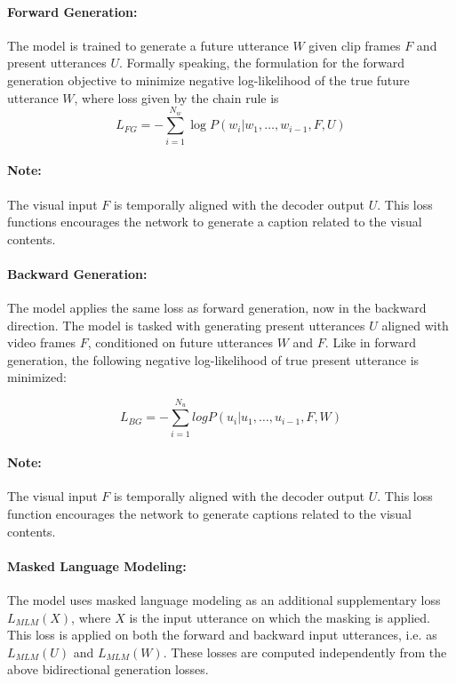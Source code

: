 \documentclass{article}
\begin{document}
\paragraph{Forward Generation:} The model is trained to generate a future utterance $W$ given
clip frames $F$ and present utterances $U$. Formally speaking, the formulation for
the forward generation objective to minimize negative log-likelihood of the true future
utterance $W$, where loss given by the chain rule is 
\[
    L_{FG} = -\sum_{i=1}^{N_w} \log P(w_i | w_1,\ldots,w_{i-1}, F, U)
\]

\paragraph{Note:}The visual input $F$ is temporally aligned with the decoder output $U$. This loss
functions encourages the network to generate a caption related to the visual contents.

\paragraph{Backward Generation:} The model applies the same loss as forward generation, now in the 
backward direction. The model is tasked with generating present utterances $U$ aligned with video frames
$F$, conditioned on future utterances $W$ and $F$. Like in forward generation, the following negative
log-likelihood of true present utterance is minimized:

\[
    L_{BG} = -\sum_{i=1}^{N_u}log P(u_i | u_1,\ldots , u_{i-1}, F, W) 
\]

\paragraph{Note:}The visual input $F$ is temporally aligned with the decoder output $U$. This loss function
encourages the network to generate captions related to the visual contents.

\paragraph{Masked Language Modeling:} The model uses masked language modeling as an additional
supplementary loss $L_{MLM}(X)$, where $X$ is the input utterance on which the masking is applied.
This loss is applied on both the forward and backward input utterances, i.e. as 
$L_{MLM}(U)$ and $L_{MLM}(W)$. These losses are computed independently from the above bidirectional
generation losses. 
\end{document}
